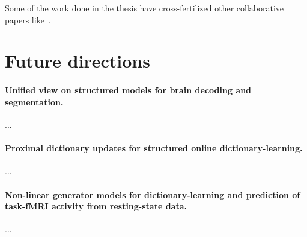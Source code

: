 Some of the work done in the thesis have cross-fertilized other collaborative papers like~\citep{rahim2015integrating,thirion2014fmri}.


\section{Future directions}
\paragraph{Unified view on structured models for brain decoding and segmentation.}
...
\paragraph{Proximal dictionary updates for structured online dictionary-learning.}
...
\paragraph{Non-linear generator models for dictionary-learning and prediction of task-fMRI activity from resting-state data.}
...
  


